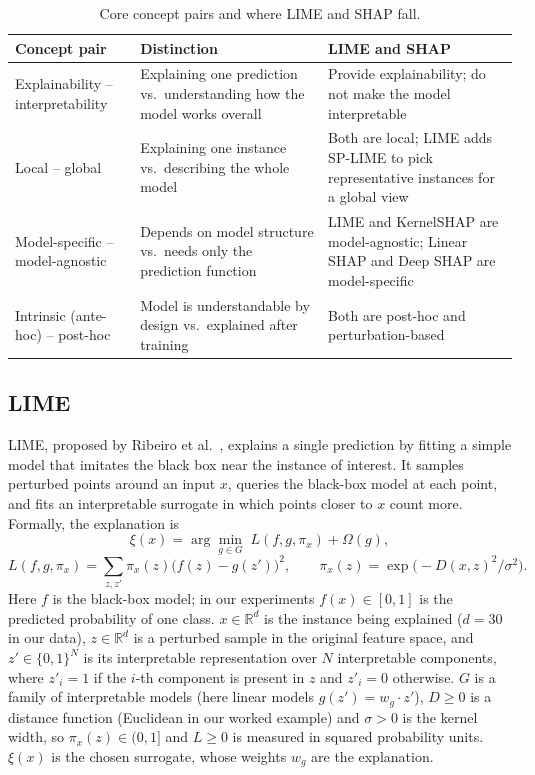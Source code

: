 \documentclass[11pt,a4paper]{article}
\begin{document}
\begin{table}[!htb]
\centering\small
\caption{Core concept pairs and where LIME and SHAP fall.}\label{tab:concepts}
\begin{tabularx}{\textwidth}{L{3.3cm}XX}
\toprule
\textbf{Concept pair} & \textbf{Distinction} & \textbf{LIME and SHAP}\\
\midrule
Explainability -- interpretability & Explaining one prediction vs.\ understanding how the model works overall & Provide explainability; do not make the model interpretable\\
Local -- global & Explaining one instance vs.\ describing the whole model & Both are local; LIME adds SP-LIME to pick representative instances for a global view \cite{ribeiro}\\
Model-specific -- model-agnostic & Depends on model structure vs.\ needs only the prediction function & LIME and KernelSHAP are model-agnostic; Linear SHAP and Deep SHAP are model-specific \cite{lundberg}\\
Intrinsic (ante-hoc) -- post-hoc & Model is understandable by design vs.\ explained after training & Both are post-hoc and perturbation-based \cite{mersha}\\
\bottomrule
\end{tabularx}
\end{table}

\subsection{LIME}\label{sec:lime}
LIME, proposed by Ribeiro et al.~\cite{ribeiro}, explains a single prediction by
fitting a simple model that imitates the black box near the instance of
interest. It samples perturbed points around an input $x$, queries the
black-box model at each point, and fits an interpretable surrogate in which
points closer to $x$ count more. Formally, the explanation is
\begin{equation}\label{eq:lime}
\xi(x) = \arg\min_{g \in G} \; L(f, g, \pi_x) + \Omega(g),
\end{equation}
\begin{equation}\label{eq:limeloss}
L(f, g, \pi_x) = \sum_{z, z'} \pi_x(z) \big( f(z) - g(z') \big)^2, \qquad \pi_x(z) = \exp\!\big( -D(x, z)^2 / \sigma^2 \big).
\end{equation}
Here $f$ is the black-box model; in our experiments $f(x) \in [0,1]$ is the
predicted probability of one class. $x \in \mathbb{R}^d$ is the instance being
explained ($d = 30$ in our data), $z \in \mathbb{R}^d$ is a perturbed sample in
the original feature space, and $z' \in \{0,1\}^N$ is its interpretable
representation over $N$ interpretable components, where $z'_i = 1$ if the
$i$-th component is present in $z$ and $z'_i = 0$ otherwise. $G$ is a family of
interpretable models (here linear models $g(z') = w_g \cdot z'$), $D \geq 0$ is
a distance function (Euclidean in our worked example) and $\sigma > 0$ is the
kernel width, so $\pi_x(z) \in (0, 1]$ and $L \geq 0$ is measured in squared
probability units. $\xi(x)$ is the chosen surrogate, whose weights $w_g$ are
the explanation.
\end{document}
